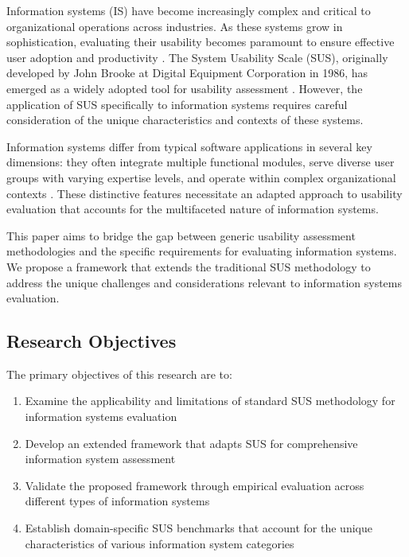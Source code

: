 \documentclass[blindrev]{informs3}
\begin{document}
Information systems (IS) have become increasingly complex and critical to organizational operations across industries. As these systems grow in sophistication, evaluating their usability becomes paramount to ensure effective user adoption and productivity \citep{Nielsen2012}. The System Usability Scale (SUS), originally developed by John Brooke at Digital Equipment Corporation in 1986, has emerged as a widely adopted tool for usability assessment \citep{Brooke1996}. However, the application of SUS specifically to information systems requires careful consideration of the unique characteristics and contexts of these systems.

Information systems differ from typical software applications in several key dimensions: they often integrate multiple functional modules, serve diverse user groups with varying expertise levels, and operate within complex organizational contexts \citep{Davis2011}. These distinctive features necessitate an adapted approach to usability evaluation that accounts for the multifaceted nature of information systems.

This paper aims to bridge the gap between generic usability assessment methodologies and the specific requirements for evaluating information systems. We propose a framework that extends the traditional SUS methodology to address the unique challenges and considerations relevant to information systems evaluation.

\subsection{Research Objectives}\label{research-objectives}

The primary objectives of this research are to:

\begin{enumerate}
    \item Examine the applicability and limitations of standard SUS methodology for information systems evaluation
    \item Develop an extended framework that adapts SUS for comprehensive information system assessment
    \item Validate the proposed framework through empirical evaluation across different types of information systems
    \item Establish domain-specific SUS benchmarks that account for the unique characteristics of various information system categories
\end{enumerate}
\end{document}
